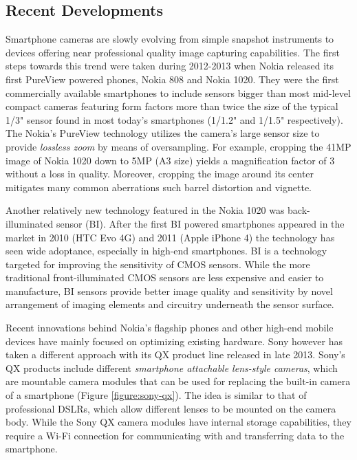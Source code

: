 \documentclass[thesis.tex]{subfiles}
\begin{document}
\subsection{Recent Developments}\label{chapter:solutions}

Smartphone cameras are slowly evolving from simple snapshot instruments to devices offering near professional quality image capturing capabilities. The first steps towards this trend were taken during 2012-2013 when Nokia released its first PureView powered phones, Nokia 808 and Nokia 1020. They were the first commercially available smartphones to include sensors bigger than most mid-level compact cameras featuring form factors more than twice the size of the typical 1/3" sensor found in most today's smartphones (1/1.2" and 1/1.5" respectively). The Nokia's PureView technology utilizes the camera's large sensor size to provide \textit{lossless zoom} by means of oversampling. For example, cropping the 41MP image of Nokia 1020 down to 5MP (A3 size) yields a magnification factor of 3 without a loss in quality. Moreover, cropping the image around its center mitigates many common aberrations such barrel distortion and vignette. \cite{lumia_1020}

Another relatively new technology featured in the Nokia 1020 was back-illuminated sensor (BI). After the first BI powered smartphones appeared in the market in 2010 (HTC Evo 4G) and 2011 (Apple iPhone 4) the technology has seen wide adoptance, especially in high-end smartphones. BI is a technology targeted for improving the sensitivity of CMOS sensors. While the more traditional front-illuminated CMOS sensors are less expensive and easier to manufacture, BI sensors provide better image quality and sensitivity by novel arrangement of imaging elements and circuitry underneath the sensor surface.

Recent innovations behind Nokia's flagship phones and other high-end mobile devices have mainly focused on optimizing existing hardware. Sony however has taken a different approach with its QX product line released in late 2013. Sony's QX products include different \textit{smartphone attachable lens-style cameras}, which are mountable camera modules that can be used for replacing the built-in camera of a smartphone (Figure \ref{figure:sony-qx}). The idea is similar to that of professional DSLRs, which allow different lenses to be mounted on the camera body. While the Sony QX camera modules have internal storage capabilities, they require a Wi-Fi connection for communicating with and transferring data to the smartphone.
\end{document}
